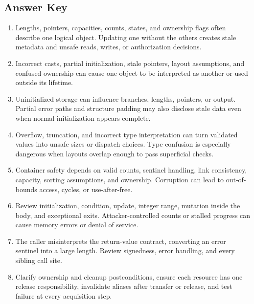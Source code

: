 \documentclass[11pt,letterpaper]{article}
\begin{document}
\subsection*{Answer Key}
\begin{enumerate}
\item Lengths, pointers, capacities, counts, states, and ownership flags often describe one logical object. Updating one without the others creates stale metadata and unsafe reads, writes, or authorization decisions.
\item Incorrect casts, partial initialization, stale pointers, layout assumptions, and confused ownership can cause one object to be interpreted as another or used outside its lifetime.
\item Uninitialized storage can influence branches, lengths, pointers, or output. Partial error paths and structure padding may also disclose stale data even when normal initialization appears complete.
\item Overflow, truncation, and incorrect type interpretation can turn validated values into unsafe sizes or dispatch choices. Type confusion is especially dangerous when layouts overlap enough to pass superficial checks.
\item Container safety depends on valid counts, sentinel handling, link consistency, capacity, sorting assumptions, and ownership. Corruption can lead to out-of-bounds access, cycles, or use-after-free.
\item Review initialization, condition, update, integer range, mutation inside the body, and exceptional exits. Attacker-controlled counts or stalled progress can cause memory errors or denial of service.
\item The caller misinterprets the return-value contract, converting an error sentinel into a large length. Review signedness, error handling, and every sibling call site.
\item Clarify ownership and cleanup postconditions, ensure each resource has one release responsibility, invalidate aliases after transfer or release, and test failure at every acquisition step.
\end{enumerate}
\end{document}
